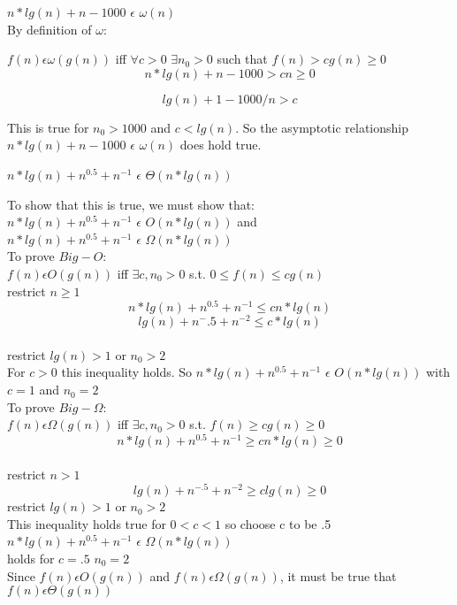 \documentclass[12pt]{article}
\newenvironment{question}[2][Question]{\begin{trivlist}
		\item[\hskip \labelsep {\bfseries #1}\hskip \labelsep {\bfseries #2.}]}{\end{trivlist}}
\begin{document}
\begin{question}{4a}	
$n*lg(n)+n-1000$ $\epsilon$ $\omega(n)$\\

By definition of $\omega$:

$f(n) \epsilon \omega(g(n))$ iff $\forall{c>0}$ $\exists{n_0>0}$ such that $f(n) > cg(n) \geq 0$\\

$$n*lg(n)+n-1000 > cn \geq 0$$

$$lg(n)+1-1000/n > c$$

This is true for $n_0>1000$ and $c<lg(n)$. So the asymptotic relationship $n*lg(n)+n-1000$ $\epsilon$ $\omega(n)$ does hold true. 

			\end{question}
	
\begin{question}{4b}	
		$n*lg(n) + n^{0.5} + n^{-1}$ $\epsilon$ $\Theta( n*lg(n) )$
		
		To show that this is true, we must show that:\\
				$n*lg(n) + n^{0.5} + n^{-1}$ $\epsilon$ $O( n*lg(n) )$
				and\\
					$n*lg(n) + n^{0.5} + n^{-1}$ $\epsilon$ $\Omega( n*lg(n) )$\\
						
						
		To prove $Big-O$:\\
		$f(n) \epsilon O(g(n))$ iff $\exists c, n_0 > 0$ s.t. $0\leq f(n) \leq cg(n)$\\
		restrict $n\geq1$
			$$n*lg(n) + n^{0.5} + n^{-1} \leq cn*lg(n)$$
			$$lg(n) + n^-.5 + n^{-2} \leq c*lg(n)$$\\
			restrict $lg(n)>1$ or $n_0>2$\\
			For $c>0$ this inequality holds.  So 				$n*lg(n) + n^{0.5} + n^{-1}$ $\epsilon$ $O( n*lg(n) )$ with
			$c=1$ and $n_0=2$\\
			
	
		To prove $Big-\Omega$:\\
			$f(n) \epsilon \Omega(g(n))$ iff $\exists c, n_0 > 0$ s.t. $f(n) \geq cg(n) \geq 0$\\

			$$n*lg(n) + n^{0.5} + n^{-1} \geq cn*lg(n) \geq 0$$\\
			restrict $n>1$
			$$lg(n)+n^{-.5}+n^{-2} \geq clg(n) \geq 0$$
			restrict $lg(n)>1$ or $n_0>2$\\
			This inequality holds true for $0<c<1$ so choose c to be .5\\
			$n*lg(n) + n^{0.5} + n^{-1}$ $\epsilon$ $\Omega( n*lg(n) )$\\ holds for $c=.5$ $n_0=2$\\
			
			Since $f(n) \epsilon O(g(n))$ and $f(n) \epsilon \Omega(g(n))$, it must be true that $f(n) \epsilon \Theta(g(n))$
			

			\end{question}
	
\end{document}
